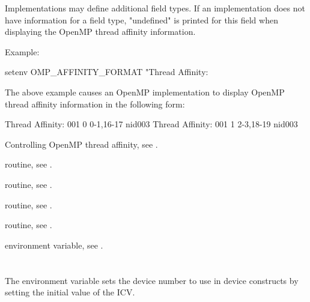 \linenumbers

Implementations may define additional field types.  If an implementation 
does not have information for a field type, "undefined" is printed for 
this field when displaying the OpenMP thread affinity information.

Example:
\begin{ompEnv}
setenv OMP_AFFINITY_FORMAT
       "Thread Affinity: %
\end{ompEnv}

The above example causes an OpenMP implementation to display OpenMP thread affinity information in the following form:
\begin{ompSyntax}
Thread Affinity: 001        0      0-1,16-17      nid003
Thread Affinity: 001        1      2-3,18-19      nid003
\end{ompSyntax}

\begin{crossrefs}
\item Controlling OpenMP thread affinity, see
.

\item {} routine, 
see .

\item {} routine, 
see .

\item {} routine, 
see .

\item {} routine, 
see .

\item {} environment variable, 
see .
\end{crossrefs}



\section{}
\label{sec:OMP_DEFAULT_DEVICE}
The  environment variable sets the device number to use in
device constructs by setting the initial value of the  ICV.

